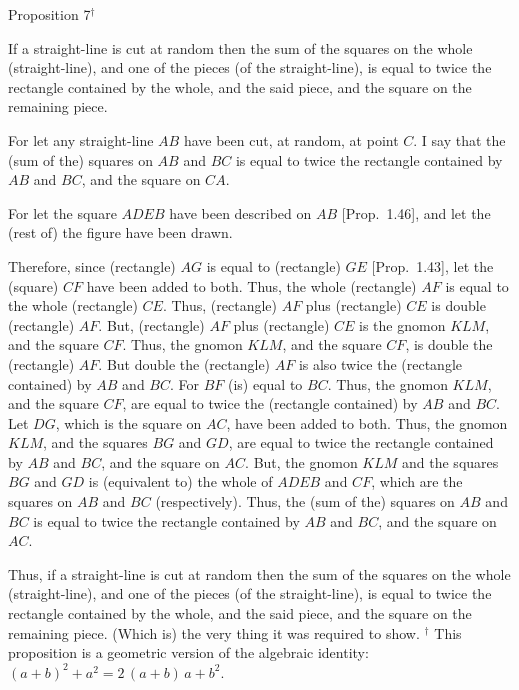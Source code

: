 
\begin{center}
{\large Proposition 7$^\dag$}
\end{center}

If a straight-line is cut at random then the sum of the squares on the
whole (straight-line), and one of the pieces (of the straight-line),  is equal to twice the rectangle
contained by the whole, and the said piece, and the square
on the remaining piece.

\epsfysize=2.2in
\centerline{}

For let any straight-line $AB$ have been cut, at random, at point $C$.
I say that the (sum of the) squares on $AB$ and $BC$ is equal to
twice the rectangle contained by $AB$ and $BC$, and the square on $CA$.

For let the square $ADEB$ have been described on $AB$ [Prop.~1.46], and let the (rest of)
the figure have been  drawn.

Therefore, since (rectangle) $AG$ is equal to (rectangle) $GE$ [Prop.~1.43],
let the (square) $CF$ have been added to both. Thus, the
whole (rectangle) $AF$ is equal to the whole (rectangle) $CE$.
Thus, (rectangle) $AF$ plus (rectangle) $CE$ is double (rectangle) $AF$.
But, (rectangle) $AF$ plus (rectangle) $CE$ is the gnomon $KLM$, and the
square  $CF$. Thus, the gnomon $KLM$, and the square $CF$, is double the (rectangle)
$AF$.
But double the (rectangle) $AF$ is also twice the (rectangle contained)
by $AB$ and $BC$. For $BF$ (is) equal to $BC$. Thus, the gnomon $KLM$, and
the square $CF$, are equal to twice the (rectangle contained) by $AB$ and $BC$.
Let $DG$, which is the square on $AC$, have been added to both.
Thus, the gnomon $KLM$, and the squares $BG$ and $GD$, are equal to
twice the rectangle contained by $AB$ and $BC$, and the square on $AC$.
But, the gnomon $KLM$ and the squares $BG$ and $GD$ is (equivalent to)
the whole of
$ADEB$ and $CF$, which are the squares on $AB$ and $BC$ (respectively).
Thus, the (sum of the) squares on $AB$ and $BC$ is equal to
twice the rectangle contained by $AB$ and $BC$, and the square on $AC$.

Thus, if a straight-line is cut at random then the sum of the squares on the
whole (straight-line), and one of the pieces (of the straight-line), is equal to twice the rectangle
contained by the whole,  and the said piece, and the square
on the remaining piece. (Which is) the very thing it was required to show.
{\footnotesize \noindent$^\dag$ This proposition is a geometric version
of the algebraic identity: $(a+b)^2+a^2 =2\,(a+b)\,a+b^2$.}

